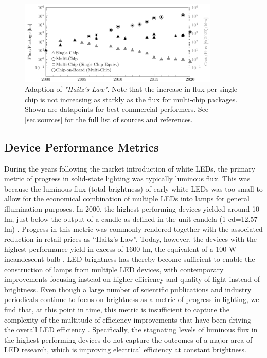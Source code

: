\documentclass[parskip=full]{article}
\begin{document}
\begin{figure}[h!]
    \centering
    \includegraphics[width=0.85\textwidth]{./figures/haitz_law_white.pdf}
    \caption{Adaption of \textit{"Haitz's Law"}. Note that the increase in flux per single chip is not increasing as starkly as the flux for multi-chip packages. Shown are datapoints for best commercial performers. See \cref{sec:sources} for the full list of sources and references.}
    \label{fig:haitz_new}
\end{figure}


\clearpage
\subsection{Device Performance Metrics}
\label{sec:device_performance_metrics}

During the years following the market introduction of white LEDs, the primary metric of progress in solid-state lighting was typically luminous flux. This was because the luminous flux (total brightness) of early white LEDs was too small to allow for the economical combination of multiple LEDs into lamps for general illumination purposes. In 2000, the highest performing devices yielded around 10 lm, just below the output of a candle as defined in the unit candela (1 cd=12.57 lm) \cite{haitz2011solid}. Progress in this metric was commonly rendered together with the associated reduction in retail prices as “Haitz’s Law”\cite{haitz1999case,haitz2011solid}. Today, however, the devices with the highest performance yield in excess of 1600 lm, the equivalent of a 100 W incandescent bulb \cite{cree2020bright}. LED brightness has thereby become sufficient to enable the construction of lamps from multiple LED devices, with contemporary improvements focusing instead on higher efficiency and quality of light instead of brightness. Even though a large number of scientific publications and industry periodicals continue to focus on brightness as a metric of progress in lighting, we find that, at this point in time, this metric is insufficient to capture the complexity of the multitude of efficiency improvements that have been driving the overall LED efficiency \cite{weinold2021compound}. Specifically, the stagnating levels of luminous flux in the highest performing devices do not capture the outcomes of a major area of LED research, which is improving electrical efficiency at constant brightness.
\end{document}
